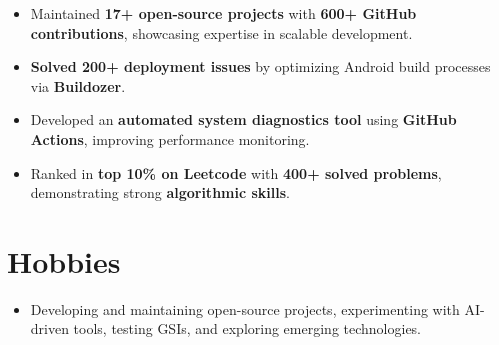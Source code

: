 \documentclass[a4paper,10pt]{article}
\begin{document}
\vspace{5pt}
\begin{itemize}
\item Maintained \textbf{17+ open-source projects} with \textbf{600+ GitHub contributions}, showcasing expertise in scalable development.\vspace{-5pt}
\item \textbf{Solved 200+ deployment issues} by optimizing Android build processes via \textbf{Buildozer}.\vspace{-5pt}
\item Developed an \textbf{automated system diagnostics tool} using \textbf{GitHub Actions}, improving performance monitoring.\vspace{-5pt}
\item Ranked in \textbf{top 10\% on Leetcode} with \textbf{400+ solved problems}, demonstrating strong \textbf{algorithmic skills}.\vspace{-5pt}


\end{itemize}
\vspace{8pt}
\section{Hobbies}

\vspace{5pt}
\begin{itemize}
\item Developing and maintaining open-source projects, experimenting with AI-driven tools, testing GSIs, and exploring emerging technologies.
\end{itemize}
\end{document}
